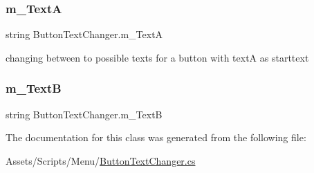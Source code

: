 \mbox{\label{class_button_text_changer_a46a20f954ddd4a0abf3864130b64f7c7}} 
\subsubsection{\texorpdfstring{m\_TextA}{m\_TextA}}
{\footnotesize\ttfamily string Button\+Text\+Changer.\+m\+\_\+\+TextA}

changing between to possible texts for a button with textA as starttext \mbox{\label{class_button_text_changer_a1a572f482973aea0d220f36f0084352f}} 
\subsubsection{\texorpdfstring{m\_TextB}{m\_TextB}}
{\footnotesize\ttfamily string Button\+Text\+Changer.\+m\+\_\+\+TextB}



The documentation for this class was generated from the following file\+:\begin{DoxyCompactItemize}
\item 
Assets/\+Scripts/\+Menu/\mbox{\hyperlink{_button_text_changer_8cs}{Button\+Text\+Changer.\+cs}}\end{DoxyCompactItemize}
